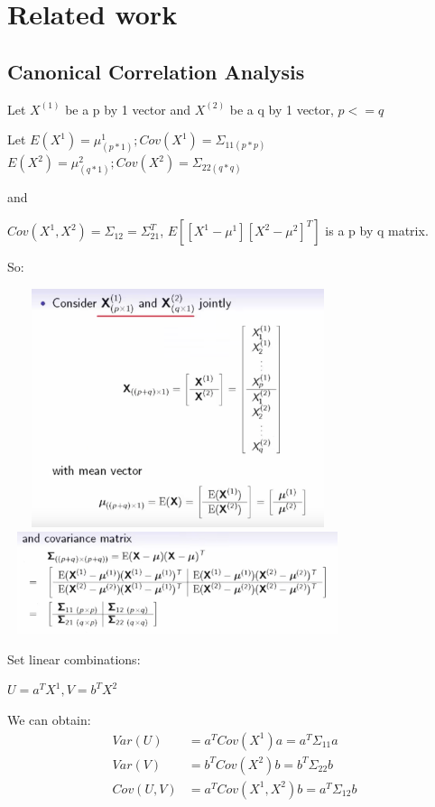 \documentclass[a4paper]{article}
\begin{document}
\section{Related work}
\subsection{Canonical Correlation Analysis}

Let $X^{(1)}$ be a p by 1 vector and $X^{(2)}$ be a q by 1 vector, $p<=q$

Let $E(X^{1}) = \mu^1_{(p*1)}; Cov(X^1) = \Sigma_{11(p*p)}$
$E(X^{2}) = \mu^2_{(q*1)}; Cov(X^2) = \Sigma_{22(q*q)}$

and

$Cov(X^1,X^2) = \Sigma_{12} = \Sigma_{21}^T$,
$E[[X^1 - \mu^1][X^2 - \mu^2]^T]$ is a p by q matrix.

So:

\begin{center}
\includegraphics[width=10cm, height=7cm]{ex.png}
\includegraphics[width=10cm, height=3cm]{cov.png}
\end{center}

Set linear combinations:

$U=a^T X^1, V = b^TX^2$

We can obtain:
\begin{align*}
Var(U) &= a^T Cov(X^1)a = a^T \Sigma_{11}a\\
Var(V) &= b^T Cov(X^2)b = b^T \Sigma_{22}b\\
Cov(U,V) &= a^T Cov(X^1,X^2)b = a^T \Sigma_{12}b
\end{align*}
\end{document}
